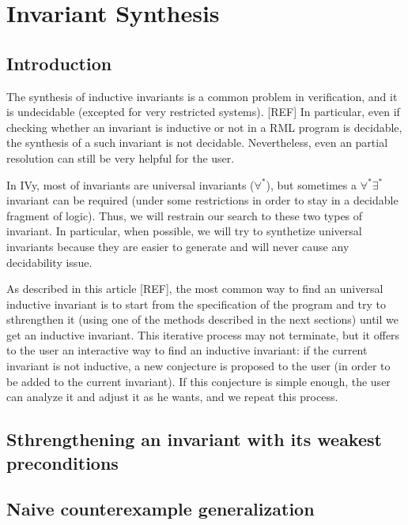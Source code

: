 \documentclass[11pt,a4paper,oldfontcommands]{memoir}
\begin{document}
\chapter{Invariant Synthesis}

    \section{Introduction}

    The synthesis of inductive invariants is a common problem in verification, and it is undecidable (excepted for very restricted systems). [REF]
    In particular, even if checking whether an invariant is inductive or not in a RML program is decidable, the synthesis of a such invariant is not decidable.
    Nevertheless, even an partial resolution can still be very helpful for the user.

    In IVy, most of invariants are universal invariants (\(\forall^*\)), but sometimes a \(\forall^*\exists^*\) invariant can be required (under some restrictions in order
    to stay in a decidable fragment of logic). Thus, we will restrain our search to these two types of invariant.
    In particular, when possible, we will try to synthetize universal invariants because they are easier to generate and will never cause any decidability issue.
    
    As described in this article [REF], the most common way to find an universal inductive invariant is to start from the specification of the program
    and try to sthrengthen it (using one of the methods described in the next sections) until we get an inductive invariant.
    This iterative process may not terminate, but it offers to the user an interactive way to find an inductive invariant:
    if the current invariant is not inductive, a new conjecture is proposed to the user (in order to be added to the current invariant).
    If this conjecture is simple enough, the user can analyze it and adjust it as he wants, and we repeat this process.

    \section{Sthrengthening an invariant with its weakest preconditions}

    \section{Naive counterexample generalization}
\end{document}
